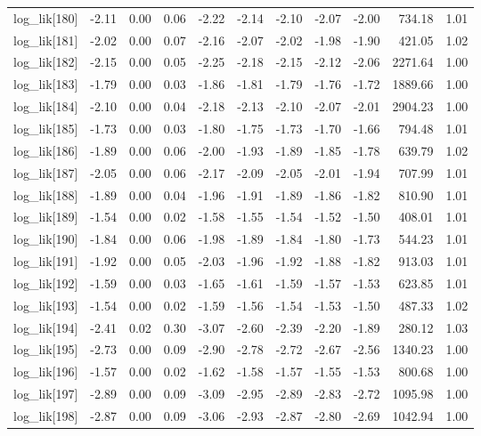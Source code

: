 \begin{table}[ht]
\begin{tabular}{rrrrrrrrrrr}
  log\_lik[180] & -2.11 & 0.00 & 0.06 & -2.22 & -2.14 & -2.10 & -2.07 & -2.00 & 734.18 & 1.01 \\ 
  log\_lik[181] & -2.02 & 0.00 & 0.07 & -2.16 & -2.07 & -2.02 & -1.98 & -1.90 & 421.05 & 1.02 \\ 
  log\_lik[182] & -2.15 & 0.00 & 0.05 & -2.25 & -2.18 & -2.15 & -2.12 & -2.06 & 2271.64 & 1.00 \\ 
  log\_lik[183] & -1.79 & 0.00 & 0.03 & -1.86 & -1.81 & -1.79 & -1.76 & -1.72 & 1889.66 & 1.00 \\ 
  log\_lik[184] & -2.10 & 0.00 & 0.04 & -2.18 & -2.13 & -2.10 & -2.07 & -2.01 & 2904.23 & 1.00 \\ 
  log\_lik[185] & -1.73 & 0.00 & 0.03 & -1.80 & -1.75 & -1.73 & -1.70 & -1.66 & 794.48 & 1.01 \\ 
  log\_lik[186] & -1.89 & 0.00 & 0.06 & -2.00 & -1.93 & -1.89 & -1.85 & -1.78 & 639.79 & 1.02 \\ 
  log\_lik[187] & -2.05 & 0.00 & 0.06 & -2.17 & -2.09 & -2.05 & -2.01 & -1.94 & 707.99 & 1.01 \\ 
  log\_lik[188] & -1.89 & 0.00 & 0.04 & -1.96 & -1.91 & -1.89 & -1.86 & -1.82 & 810.90 & 1.01 \\ 
  log\_lik[189] & -1.54 & 0.00 & 0.02 & -1.58 & -1.55 & -1.54 & -1.52 & -1.50 & 408.01 & 1.01 \\ 
  log\_lik[190] & -1.84 & 0.00 & 0.06 & -1.98 & -1.89 & -1.84 & -1.80 & -1.73 & 544.23 & 1.01 \\ 
  log\_lik[191] & -1.92 & 0.00 & 0.05 & -2.03 & -1.96 & -1.92 & -1.88 & -1.82 & 913.03 & 1.01 \\ 
  log\_lik[192] & -1.59 & 0.00 & 0.03 & -1.65 & -1.61 & -1.59 & -1.57 & -1.53 & 623.85 & 1.01 \\ 
  log\_lik[193] & -1.54 & 0.00 & 0.02 & -1.59 & -1.56 & -1.54 & -1.53 & -1.50 & 487.33 & 1.02 \\ 
  log\_lik[194] & -2.41 & 0.02 & 0.30 & -3.07 & -2.60 & -2.39 & -2.20 & -1.89 & 280.12 & 1.03 \\ 
  log\_lik[195] & -2.73 & 0.00 & 0.09 & -2.90 & -2.78 & -2.72 & -2.67 & -2.56 & 1340.23 & 1.00 \\ 
  log\_lik[196] & -1.57 & 0.00 & 0.02 & -1.62 & -1.58 & -1.57 & -1.55 & -1.53 & 800.68 & 1.00 \\ 
  log\_lik[197] & -2.89 & 0.00 & 0.09 & -3.09 & -2.95 & -2.89 & -2.83 & -2.72 & 1095.98 & 1.00 \\ 
  log\_lik[198] & -2.87 & 0.00 & 0.09 & -3.06 & -2.93 & -2.87 & -2.80 & -2.69 & 1042.94 & 1.00 \\ 

\end{tabular}
\end{table}
